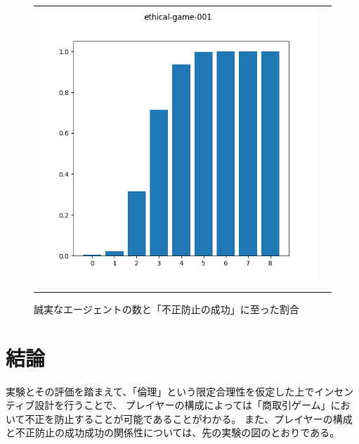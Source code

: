 \begin{figure}[h]
  \begin{tabular}{cc}
    \begin{minipage}[t]{1\hsize}
      \centering
      \includegraphics[keepaspectratio, width=1\linewidth]{./04_ethical-commerce-game/ethical-game-001.png}
      \caption{誠実なエージェントの数と「不正防止の成功」に至った割合}
      \label{ethical-game-001}
    \end{minipage}
  \end{tabular}
\end{figure}

\section{結論}
実験とその評価を踏まえて、「倫理」という限定合理性を仮定した上でインセンティブ設計を行うことで、
プレイヤーの構成によっては「商取引ゲーム」において不正を防止することが可能であることがわかる。
また、プレイヤーの構成と不正防止の成功成功の関係性については、先の実験の図のとおりである。

\clearpage


% 